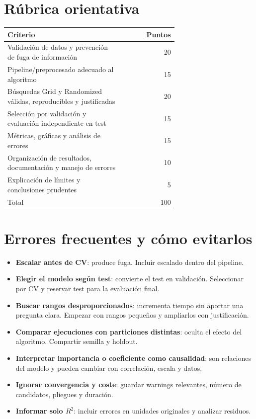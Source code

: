 \documentclass[11pt,a4paper]{article}
\begin{document}
\section{Rúbrica orientativa}
\begin{longtable}{p{0.68\linewidth}r}
\toprule
\textbf{Criterio} & \textbf{Puntos}\\
\midrule
Validación de datos y prevención de fuga de información & 20\\
Pipeline/preprocesado adecuado al algoritmo & 15\\
Búsquedas Grid y Randomized válidas, reproducibles y justificadas & 20\\
Selección por validación y evaluación independiente en test & 15\\
Métricas, gráficas y análisis de errores & 15\\
Organización de resultados, documentación y manejo de errores & 10\\
Explicación de límites y conclusiones prudentes & 5\\
\midrule
Total & 100\\
\bottomrule
\end{longtable}

\section{Errores frecuentes y cómo evitarlos}
\begin{itemize}
\item \textbf{Escalar antes de CV}: produce fuga. Incluir escalado dentro del pipeline.
\item \textbf{Elegir el modelo según test}: convierte el test en validación. Seleccionar por CV y reservar test para la evaluación final.
\item \textbf{Buscar rangos desproporcionados}: incrementa tiempo sin aportar una pregunta clara. Empezar con rangos pequeños y ampliarlos con justificación.
\item \textbf{Comparar ejecuciones con particiones distintas}: oculta el efecto del algoritmo. Compartir semilla y holdout.
\item \textbf{Interpretar importancia o coeficiente como causalidad}: son relaciones del modelo y pueden cambiar con correlación, escala y datos.
\item \textbf{Ignorar convergencia y coste}: guardar warnings relevantes, número de candidatos, pliegues y duración.
\item \textbf{Informar solo $R^2$}: incluir errores en unidades originales y analizar residuos.
\end{itemize}
\end{document}
